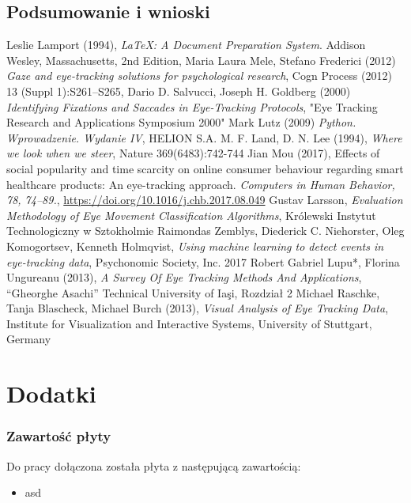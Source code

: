 \documentclass[14pt,a4paper,twoside,openright,titlepage]{extbook}
\begin{document}
    \chapter{Podsumowanie i wnioski}
        \blindtext
    \backmatter
    \fancyhf{}
    \pagestyle{plain}
    \renewcommand{\headrulewidth}{0pt}
    \begin{thebibliography}{99}
            Leslie Lamport (1994),
            \emph{\LaTeX: A Document Preparation System}.
            Addison Wesley, Massachusetts,
            2nd Edition,
            Maria Laura Mele, Stefano Frederici (2012)
            \emph{Gaze and eye-tracking solutions for psychological research},
            Cogn Process (2012) 13 (Suppl 1):S261–S265,
            Dario D. Salvucci, Joseph H. Goldberg (2000)
            \emph{Identifying Fixations and Saccades in Eye-Tracking Protocols},
            "Eye Tracking Research and Applications Symposium 2000"
            Mark Lutz (2009)
            \emph{Python. Wprowadzenie. Wydanie IV},
            HELION S.A.
            M. F. Land, D. N. Lee (1994),
            \emph{Where we look when we steer},
            Nature 369(6483):742-744
            Jian Mou (2017),
            Effects of social popularity and time scarcity on online consumer behaviour regarding smart healthcare products: An eye-tracking approach. \emph{Computers in Human Behavior, 78, 74–89.},
            \url{https://doi.org/10.1016/j.chb.2017.08.049}
            Gustav Larsson,
            \emph{Evaluation Methodology of Eye
            Movement Classification Algorithms},
            Królewski Instytut Technologiczny w Sztokholmie
            Raimondas Zemblys, Diederick C. Niehorster, Oleg Komogortsev, Kenneth Holmqvist,
            \emph{Using machine learning to detect events in eye-tracking data},
            Psychonomic Society, Inc. 2017
            Robert Gabriel Lupu*, Florina Ungureanu (2013),
            \emph{A Survey Of Eye Tracking Methods And Applications},
            “Gheorghe Asachi” Technical University of Iaşi,
            Rozdział 2
            Michael Raschke, Tanja Blascheck, Michael Burch (2013),
            \emph{Visual Analysis of Eye Tracking Data},
            Institute for Visualization and Interactive Systems, University of Stuttgart, Germany
    \end{thebibliography}
    \part*{Dodatki}
        \section*{Zawartość płyty}
            Do pracy dołączona została płyta z następującą zawartością:
            \begin{itemize}
                \item asd
            \end{itemize}
        \listoffigures
        \listoftables
\end{document}
